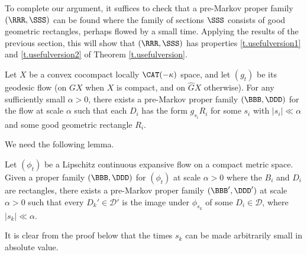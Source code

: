To complete our argument, it suffices to check that a pre-Markov proper family $(\RRR, \SSS)$ can be found where the family of sections $\SSS$ consists of good geometric rectangles, perhaps flowed by a small time. Applying the results of the previous section, this will show that $(\RRR, \SSS)$ has properties \eqref{t.usefulversion1} and \eqref{t.usefulversion2} of Theorem \ref{t.usefulversion}.

\begin{prop}\label{prop:good mpf}
Let $X$ be a convex cocompact locally $\CAT(-\kappa)$ space, and let $(g_t)$ be its geodesic flow (on $GX$ when $X$ is compact, and on $\hat GX$ otherwise). For any sufficiently small $\alpha>0$, there exists a pre-Markov proper family $(\BBB, \DDD)$ for the flow at scale $\alpha$ such that each $D_i$ has the form $g_{s_i}R_i$ for some $s_i$ with $|s_i| \ll  \alpha$ and some good geometric rectangle $R_i$.
\end{prop}

We need the following lemma.

\begin{lem} \label{markovpf}
Let $(\phi_t)$ be a Lipschitz continuous expansive flow on a compact metric space. Given a proper family $(\BBB, \DDD)$ for $(\phi_t)$ at scale $\alpha>0$ where the $B_i$ and $D_i$ are rectangles, there exists a pre-Markov proper family $(\BBB', \DDD')$ at scale $\alpha>0$ such that every $D_k'\in\mathcal{D}'$ is the image under $\phi_{s_k}$ of some $D_i\in\mathcal{D}$, where $|s_k| \ll  \alpha$.
\end{lem}

It is clear from the proof below that the times $s_k$ can be made arbitrarily small in absolute value.

